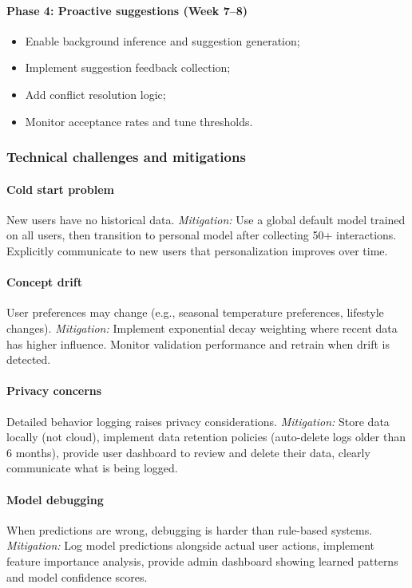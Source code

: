 \paragraph{Phase 4: Proactive suggestions (Week 7--8)}
\begin{itemize}
    \item Enable background inference and suggestion generation;
    \item Implement suggestion feedback collection;
    \item Add conflict resolution logic;
    \item Monitor acceptance rates and tune thresholds.
\end{itemize}

\subsubsection{Technical challenges and mitigations}

\paragraph{Cold start problem}
New users have no historical data. \emph{Mitigation:} Use a global
default model trained on all users, then transition to personal model
after collecting 50+ interactions. Explicitly communicate to new users
that personalization improves over time.

\paragraph{Concept drift}
User preferences may change (e.g., seasonal temperature preferences,
lifestyle changes). \emph{Mitigation:} Implement exponential decay
weighting where recent data has higher influence. Monitor validation
performance and retrain when drift is detected.

\paragraph{Privacy concerns}
Detailed behavior logging raises privacy considerations. \emph{Mitigation:}
Store data locally (not cloud), implement data retention policies
(auto-delete logs older than 6 months), provide user dashboard to review
and delete their data, clearly communicate what is being logged.

\paragraph{Model debugging}
When predictions are wrong, debugging is harder than rule-based systems.
\emph{Mitigation:} Log model predictions alongside actual user actions,
implement feature importance analysis, provide admin dashboard showing
learned patterns and model confidence scores.

